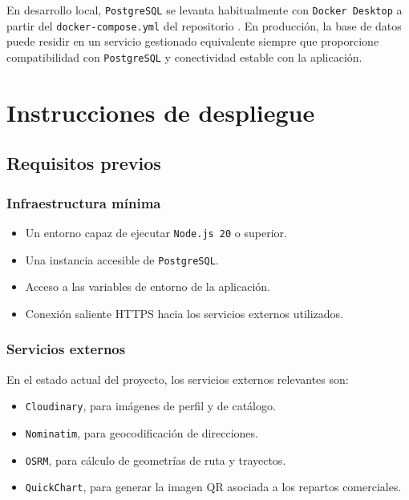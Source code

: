 En desarrollo local, \texttt{PostgreSQL} se levanta habitualmente con \texttt{Docker Desktop} a partir del \texttt{docker-compose.yml} del repositorio \citep{dockerdocs2026}. En producción, la base de datos puede residir en un servicio gestionado equivalente siempre que proporcione compatibilidad con \texttt{PostgreSQL} y conectividad estable con la aplicación.

\section{Instrucciones de despliegue}

\subsection{Requisitos previos}

\subsubsection*{Infraestructura mínima}

\begin{itemize}
    \item Un entorno capaz de ejecutar \texttt{Node.js 20} o superior.
    \item Una instancia accesible de \texttt{PostgreSQL}.
    \item Acceso a las variables de entorno de la aplicación.
    \item Conexión saliente HTTPS hacia los servicios externos utilizados.
\end{itemize}

\subsubsection*{Servicios externos}

En el estado actual del proyecto, los servicios externos relevantes son:

\begin{itemize}
    \item \texttt{Cloudinary}, para imágenes de perfil y de catálogo.
    \item \texttt{Nominatim}, para geocodificación de direcciones.
    \item \texttt{OSRM}, para cálculo de geometrías de ruta y trayectos.
    \item \texttt{QuickChart}, para generar la imagen QR asociada a los repartos comerciales.
\end{itemize}

